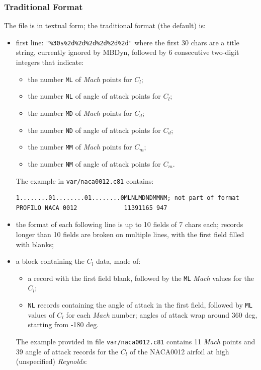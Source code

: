 \subsubsection{Traditional Format}
The file is in textual form; the traditional format (the default) is:
\begin{itemize}
\item first line: \texttt{"\%30s\%2d\%2d\%2d\%2d\%2d\%2d"} 
where the first 30 chars are a title string, currently ignored by MBDyn,
followed by 6 consecutive two-digit integers that indicate:
	\begin{itemize}
	\item the number \texttt{ML} of \emph{Mach} points for $C_l$;
	\item the number \texttt{NL} of angle of attack points for $C_l$;
	\item the number \texttt{MD} of \emph{Mach} points for $C_d$;
	\item the number \texttt{ND} of angle of attack points for $C_d$;
	\item the number \texttt{MM} of \emph{Mach} points for $C_m$;
	\item the number \texttt{NM} of angle of attack points for $C_m$.
	\end{itemize}
The example in \texttt{var/naca0012.c81} contains:
{\small
\begin{verbatim}
1........01........01........0MLNLMDNDMMNM; not part of format
PROFILO NACA 0012             11391165 947
\end{verbatim}
}
\item the format of each following line is up to 10 fields of 7 chars each;
records longer than 10 fields are broken on multiple lines,
with the first field filled with blanks;
\item a block containing the $C_l$ data, made of:
	\begin{itemize}
	\item a record with the first field blank, followed by
	the \texttt{ML} \emph{Mach} values for the $C_l$;
	\item \texttt{NL} records containing the angle of attack
	in the first field, followed by \texttt{ML} values of $C_l$
	for each \emph{Mach} number; angles of attack wrap around 
	360 deg, starting from -180 deg.
	\end{itemize}
The example provided in file \texttt{var/naca0012.c81}
contains 11 \emph{Mach} points and 39 angle of attack records for the $C_l$
of the NACA0012 airfoil at high (unspecified) \emph{Reynolds}:
{\small
\begin{verbatim}

\end{verbatim}}
\end{itemize}
